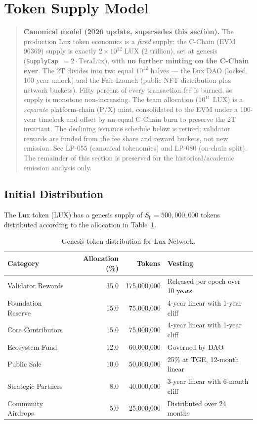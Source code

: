 \section{Token Supply Model}
\label{sec:supply}

\begin{quote}
\textbf{Canonical model (2026 update, supersedes this section).} The production
Lux token economics is a \emph{fixed} supply: the C-Chain (EVM 96369) supply is
exactly $2\times10^{12}$ LUX (2 trillion), set at genesis
(\texttt{SupplyCap}~$=2\cdot\text{TeraLux}$), with \textbf{no further minting on
the C-Chain ever}. The 2T divides into two equal $10^{12}$ halves --- the Lux DAO
(locked, 100-year unlock) and the Fair Launch (public NFT distribution plus
network buckets). Fifty percent of every transaction fee is burned, so supply is
monotone non-increasing. The team allocation ($10^{11}$ LUX) is a \emph{separate}
platform-chain (P/X) mint, consolidated to the EVM under a 100-year timelock and
offset by an equal C-Chain burn to preserve the 2T invariant. The declining
issuance schedule below is retired; validator rewards are funded from the fee
share and reward buckets, not new emission. See LP-055 (canonical tokenomics) and
LP-080 (on-chain split). The remainder of this section is preserved for the
historical/academic emission analysis only.
\end{quote}

\subsection{Initial Distribution}

The Lux token (LUX) has a genesis supply of $S_0 = 500{,}000{,}000$ tokens distributed according to the allocation in Table~\ref{tab:distribution}.

\begin{table}[H]
\centering
\caption{Genesis token distribution for Lux Network.}
\label{tab:distribution}
\begin{tabular}{lrrp{5cm}}
\toprule
\textbf{Category} & \textbf{Allocation (\%)} & \textbf{Tokens} & \textbf{Vesting} \\
\midrule
Validator Rewards & 35.0 & 175,000,000 & Released per epoch over 10 years \\
Foundation Reserve & 15.0 & 75,000,000 & 4-year linear with 1-year cliff \\
Core Contributors & 15.0 & 75,000,000 & 4-year linear with 1-year cliff \\
Ecosystem Fund & 12.0 & 60,000,000 & Governed by DAO \\
Public Sale & 10.0 & 50,000,000 & 25\% at TGE, 12-month linear \\
Strategic Partners & 8.0 & 40,000,000 & 3-year linear with 6-month cliff \\
Community Airdrops & 5.0 & 25,000,000 & Distributed over 24 months \\
\bottomrule
\end{tabular}
\end{table}

